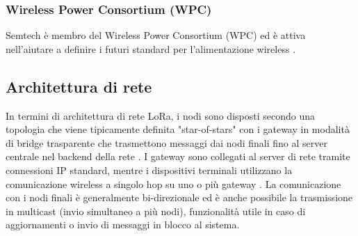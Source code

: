\documentclass[a4paper]{report} %
\begin{document}
\subsubsection{Wireless Power Consortium (WPC)}
Semtech è membro del Wireless Power Consortium (WPC) ed è attiva nell'aiutare a definire i futuri standard per l'alimentazione wireless \cite{art:rif.24}.


\subsection{Architettura di rete}
In termini di architettura di rete LoRa, i nodi sono disposti secondo una topologia che viene tipicamente definita "star-of-stars" con i gateway in modalità di bridge trasparente che trasmettono messaggi dai nodi finali fino al server centrale nel backend della rete \cite{art:rif.27}.
I gateway sono collegati al server di rete tramite connessioni IP standard, mentre i dispositivi terminali utilizzano la comunicazione wireless a singolo hop su uno o più gateway \cite{art:rif.28}. 
La comunicazione con i nodi finali è generalmente bi-direzionale ed è anche possibile la trasmissione in multicast (invio simultaneo a più nodi), funzionalità utile in caso di aggiornamenti o invio di messaggi in blocco al sistema. 
\end{document}
